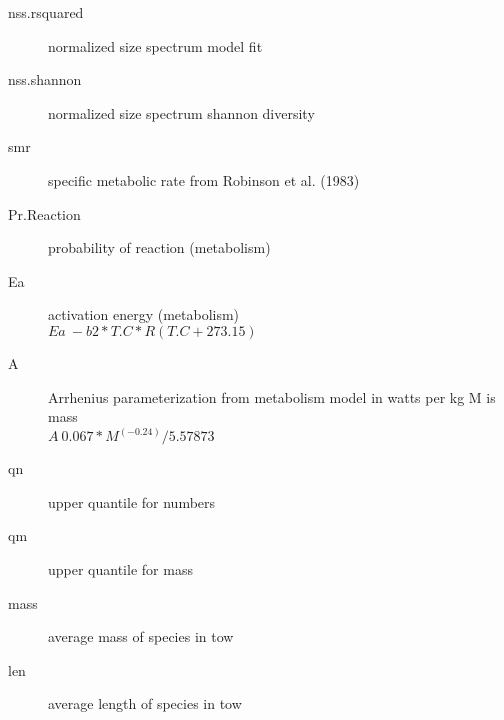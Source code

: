 \documentclass[10pt,letter,twocolumn]{article}
\begin{document}
\begin{description}
	\item[nss.rsquared] normalized size spectrum model fit
	\item[nss.shannon] normalized size spectrum shannon diversity
	\item[smr] specific metabolic rate from Robinson et al. (1983)
	\item[Pr.Reaction] probability of reaction (metabolism)
	\item[Ea] activation energy (metabolism) \\$Ea ~ -b2 * T.C * R (T.C +273.15)$
	\item[A] Arrhenius parameterization from metabolism model in watts per kg M is mass \\ $A  ~ 0.067 * M^(-0.24) / 5.57873 $
	\item[qn] upper quantile for numbers
	\item[qm] upper quantile for mass
	\item[mass] average mass of species in tow
	\item[len] average length of species in tow
	
	
\end{description}
\end{document}
